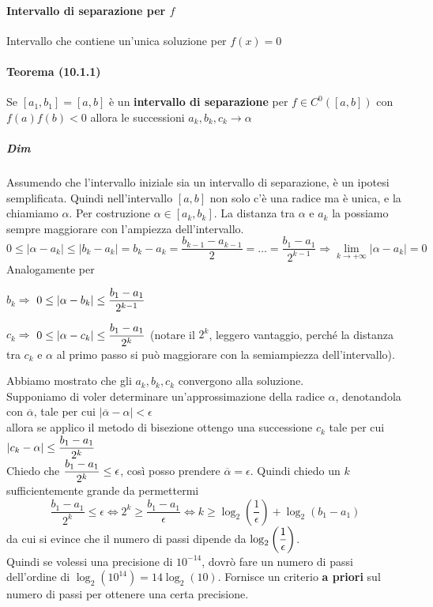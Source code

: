\documentclass[10pt]{book}
\begin{document}
\paragraph{Intervallo di separazione per $f$} Intervallo che contiene un'unica soluzione per $f(x) = 0$
\paragraph{Teorema (10.1.1)} Se $[a_1, b_1] = [a, b]$ è un \textbf{intervallo di separazione} per $f \in C^0([a, b])$ con $f(a)f(b) < 0$ allora le successioni $a_k, b_k, c_k \longrightarrow \alpha$
\subparagraph{Dim} Assumendo che l'intervallo iniziale sia un intervallo di separazione, è un ipotesi semplificata. Quindi nell'intervallo $[a, b]$ non solo c'è una radice ma è unica, e la chiamiamo $\alpha$. Per costruzione $\alpha \in [a_k, b_k]$. La distanza tra $\alpha$ e $a_k$ la possiamo sempre maggiorare con l'ampiezza dell'intervallo.
$$0 \leq |\alpha - a_k| \leq |b_k - a_k| = b_k - a_k = \frac{b_{k-1} - a_{k-1}}{2} = \ldots = \frac{b_1 - a_1}{2^{k-1}} \Rightarrow \lim_{k\to +\infty} |\alpha - a_k| = 0$$
Analogamente per \begin{list}{}{}
	\item $b_k\Rightarrow$ $0\leq |\alpha - b_k| \leq \mathlarger{\frac{b_1 - a_1}{2^{k-1}}}$
	\item $c_k\Rightarrow$ $0\leq |\alpha - c_k| \leq \mathlarger{\frac{b_1 - a_1}{2^{k}}}$ (notare il $2^k$, leggero vantaggio, perché la distanza tra $c_k$ e $\alpha$ al primo passo si può maggiorare con la semiampiezza dell'intervallo).
\end{list}
Abbiamo mostrato che gli $a_k, b_k, c_k$ convergono alla soluzione.\\
Supponiamo di voler determinare un'approssimazione della radice $\alpha$, denotandola con $\overline{\alpha}$, tale per cui $|\overline{\alpha} - \alpha| < \epsilon$\\ allora se applico il metodo di bisezione ottengo una successione $c_k$ tale per cui $|c_k - \alpha| \leq \mathlarger{\frac{b_1 - a_1}{2^k}}$\\
Chiedo che $\mathlarger{\frac{b_1 - a_1}{2^k}} \leq \epsilon$, così posso prendere $\overline{\alpha} = \epsilon$. Quindi chiedo un $k$ sufficientemente grande da permettermi $$\frac{b_1 - a_1}{2^k} \leq \epsilon \Leftrightarrow 2^k \geq \frac{b_1 - a_1}{\epsilon} \Leftrightarrow k \geq \log_2\left(\frac{1}{\epsilon}\right) + \log_2\left(b_1 - a_1\right)$$
da cui si evince che il numero di passi dipende da $\log_2\left(\mathlarger{\frac{1}{\epsilon}}\right)$.\\
Quindi se volessi una precisione di $10^{-14}$, dovrò fare un numero di passi dell'ordine di $\log_2(10^{14}) = 14\log_2(10)$. Fornisce un criterio \textbf{a priori} sul numero di passi per ottenere una certa precisione.
\end{document}
